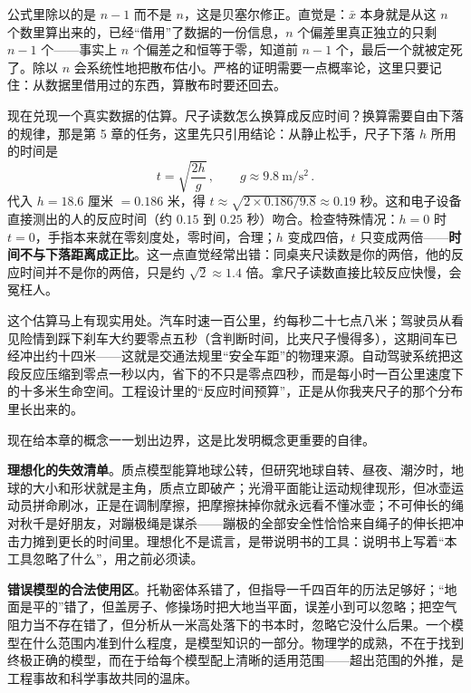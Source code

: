\begin{challenge}
公式里除以的是 \(n-1\) 而不是 \(n\)，这是贝塞尔修正。直觉是：\(\bar{x}\) 本身就是从这 \(n\) 个数里算出来的，已经“借用”了数据的一份信息，\(n\) 个偏差里真正独立的只剩 \(n-1\) 个——事实上 \(n\) 个偏差之和恒等于零，知道前 \(n-1\) 个，最后一个就被定死了。除以 \(n\) 会系统性地把散布估小。严格的证明需要一点概率论，这里只要记住：从数据里借用过的东西，算散布时要还回去。
\end{challenge}

现在兑现一个真实数据的估算。尺子读数怎么换算成反应时间？换算需要自由下落的规律，那是第 5 章的任务，这里先只引用结论：从静止松手，尺子下落 \(h\) 所用的时间是
\[
t=\sqrt{\frac{2h}{g}}\,,\qquad g\approx 9.8\ \mathrm{m/s^2}\,.
\]
代入 \(h=18.6\) 厘米 \(=0.186\) 米，得 \(t\approx\sqrt{2\times0.186/9.8}\approx 0.19\) 秒。这和电子设备直接测出的人的反应时间（约 \(0.15\) 到 \(0.25\) 秒）吻合。检查特殊情况：\(h=0\) 时 \(t=0\)，手指本来就在零刻度处，零时间，合理；\(h\) 变成四倍，\(t\) 只变成两倍——\textbf{时间不与下落距离成正比}。这一点直觉经常出错：同桌夹尺读数是你的两倍，他的反应时间并不是你的两倍，只是约 \(\sqrt{2}\approx1.4\) 倍。拿尺子读数直接比较反应快慢，会冤枉人。

这个估算马上有现实用处。汽车时速一百公里，约每秒二十七点八米；驾驶员从看见险情到踩下刹车大约要零点五秒（含判断时间，比夹尺子慢得多），这期间车已经冲出约十四米——这就是交通法规里“安全车距”的物理来源。自动驾驶系统把这段反应压缩到零点一秒以内，省下的不只是零点四秒，而是每小时一百公里速度下的十多米生命空间。工程设计里的“反应时间预算”，正是从你我夹尺子的那个分布里长出来的。


现在给本章的概念一一划出边界，这是比发明概念更重要的自律。

\textbf{理想化的失效清单}。质点模型能算地球公转，但研究地球自转、昼夜、潮汐时，地球的大小和形状就是主角，质点立即破产；光滑平面能让运动规律现形，但冰壶运动员拼命刷冰，正是在调制摩擦，把摩擦抹掉你就永远看不懂冰壶；不可伸长的绳对秋千是好朋友，对蹦极绳是谋杀——蹦极的全部安全性恰恰来自绳子的伸长把冲击力摊到更长的时间里。理想化不是谎言，是带说明书的工具：说明书上写着“本工具忽略了什么”，用之前必须读。

\textbf{错误模型的合法使用区}。托勒密体系错了，但指导一千四百年的历法足够好；“地面是平的”错了，但盖房子、修操场时把大地当平面，误差小到可以忽略；把空气阻力当不存在错了，但分析从一米高处落下的书本时，忽略它没什么后果。一个模型在什么范围内准到什么程度，是模型知识的一部分。物理学的成熟，不在于找到终极正确的模型，而在于给每个模型配上清晰的适用范围——超出范围的外推，是工程事故和科学事故共同的温床。

